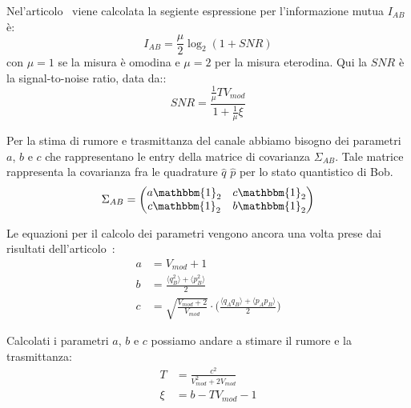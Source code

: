 Nel'articolo~\cite{https://doi.org/10.1002/qute.201800011} viene calcolata la segiente espressione per l'informazione mutua $I_{AB}$ \`e:
\begin{equation} \label{eq:AB-info}
I_{AB} = \frac{\mu}{2}\log_2(1 + SNR)
\end{equation}
con $\mu = 1$ se la misura \`e omodina e $\mu = 2$ per la misura eterodina. Qui la $SNR$ è la signal-to-noise ratio, data da::
\begin{equation} \label{eq:snr}
SNR = \frac{\frac{1}{\mu} T V_{mod}}{1 + \frac{1}{\mu} \xi}
\end{equation}

Per la stima di rumore e trasmittanza del canale abbiamo bisogno dei parametri $a$, $b$ e $c$ che rappresentano le entry della matrice di covarianza $\Sigma_{AB}$. Tale matrice rappresenta la covarianza fra le quadrature $\hat q$ $\hat p$ per lo stato quantistico di Bob.
\begin{equation}
\Sigma_{AB} =
\begin{pmatrix}
a \mathbbm{1}_2 & c \mathbbm{1}_2 \\
c \mathbbm{1}_2 & b \mathbbm{1}_2
\end{pmatrix}
\end{equation}

Le equazioni per il calcolo dei parametri vengono ancora una volta prese dai risultati dell'articolo~\cite{https://doi.org/10.1002/qute.201800011}:
\begin{equation}
\begin{split}
a& = V_{mod} + 1 \\
b& = \frac{\langle q_B^2 \rangle + \langle p_B^2 \rangle}{2} \\
c& = \sqrt{\frac{V_{mod} + 2}{V_{mod}}} \cdot \biggl ( \frac{\langle q_Aq_B \rangle + \langle p_Ap_B \rangle}{2}\biggr )
\end{split}
\end{equation}

Calcolati i parametri $a$, $b$ e $c$ possiamo andare a stimare il rumore e la trasmittanza:
\begin{equation}
\begin{split}
T& = \frac{c^2}{V_{mod}^2 + 2V_{mod}} \\
\xi& = b - TV_{mod} -1
\end{split}
\end{equation}

